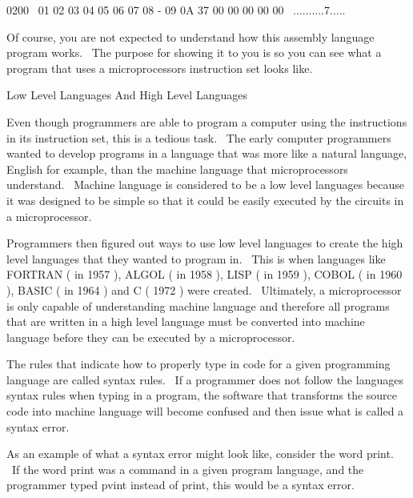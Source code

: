 \documentclass[12pt,twoside]{book}
\begin{document}
\bigskip

0200 \ 01 02 03 04 05 06 07 08 {}- 09 0A 37 00 00 00 00 00
\ ..........7.....


\bigskip

Of course, you are not expected to understand how this assembly language
program works. \ The purpose for showing it to you is so you can see
what a program that uses a microprocessor{\textquotesingle}s
instruction set looks like.


\bigskip

Low Level Languages And High Level Languages

Even though programmers are able to program a computer using the
instructions in its instruction set, this is a tedious task. \ The
early computer programmers wanted to develop programs in a language
that was more like a natural language, English for example, than the
machine language that microprocessors understand. \ Machine language is
considered to be a low level languages because it was designed to be
simple so that it could be easily executed by the circuits in a
microprocessor. \ 


\bigskip

Programmers then figured out ways to use low level languages to create
the high level languages that they wanted to program in. \ This is when
languages like FORTRAN ( in 1957 ), ALGOL ( in 1958 ), LISP ( in 1959
), COBOL ( in 1960 ), BASIC ( in 1964 ) and C ( 1972 ) were created.
\ Ultimately, a microprocessor is only capable of understanding machine
language and therefore all programs that are written in a high level
language must be converted into machine language before they can be
executed by a microprocessor.


\bigskip

The rules that indicate how to properly type in code for a given
programming language are called syntax rules. \ If a programmer does
not follow the language{\textquotesingle}s syntax rules when typing in
a program, the software that transforms the source code into machine
language will become confused and then issue what is called a syntax
error.


\bigskip

As an example of what a syntax error might look like, consider the word
{\textquotesingle}print{\textquotesingle}. \ If the word
{\textquotesingle}print{\textquotesingle} was a command in a given
program language, and the programmer typed
{\textquotesingle}pvint{\textquotesingle} instead of
{\textquotesingle}print{\textquotesingle}, this would be a syntax
error.
\end{document}
